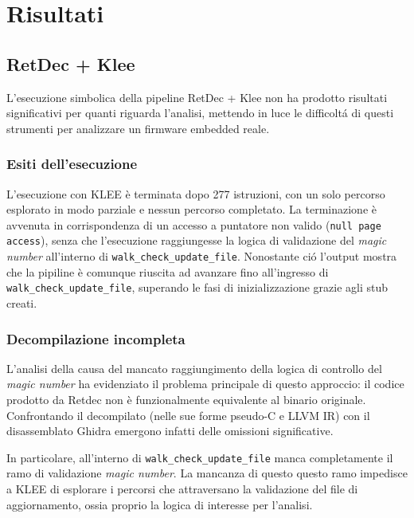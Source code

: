 \chapter{Risultati}
    \label{chap:risultati}
        \section{RetDec + Klee}
        \label{subsec:risultati_retdec+klee}
            L'esecuzione simbolica della pipeline RetDec + Klee non ha prodotto risultati significativi per quanti riguarda l'analisi, mettendo in luce le difficoltá di questi strumenti per analizzare un firmware embedded reale.

            \subsection{Esiti dell'esecuzione}
            \label{subsec:esiti_klee}
            L'esecuzione con KLEE è terminata dopo 277 istruzioni, con un solo percorso esplorato in modo parziale e nessun percorso completato. La terminazione è avvenuta in corrispondenza di un accesso a puntatore non valido (\texttt{null page access}), senza che l'esecuzione raggiungesse la logica di validazione del \textit{magic number} all'interno di \texttt{walk\_check\_update\_file}. Nonostante ció l'output mostra che la pipiline è comunque riuscita ad avanzare fino all'ingresso di \texttt{walk\_check\_update\_file}, superando le fasi di inizializzazione grazie agli stub creati.

            \subsection{Decompilazione incompleta}
            \label{subsec:decompilazione_incompleta}
            L'analisi della causa del mancato raggiungimento della logica di controllo del \textit{magic number} ha evidenziato il problema principale di questo approccio: il codice prodotto da Retdec non è funzionalmente equivalente al binario originale. Confrontando il decompilato (nelle sue forme pseudo-C e LLVM IR) con il disassemblato Ghidra emergono infatti delle omissioni significative.

            In particolare, all'interno di \texttt{walk\_check\_update\_file} manca completamente il ramo di validazione \textit{magic number}. La mancanza di questo questo ramo impedisce a KLEE di esplorare i percorsi che attraversano la validazione del file di aggiornamento, ossia proprio la logica di interesse per l'analisi.

